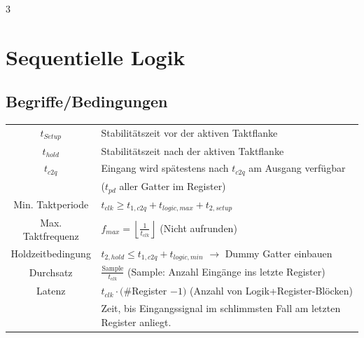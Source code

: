 \documentclass[6pt,a4paper]{scrartcl}
\newcommand{\ra}[0]{\ensuremath{\rightarrow}} 									%
\begin{document}
\begin{multicols*}{3}
	\vspace{-3mm}
	\section{Sequentielle Logik}
	\begin{sectionbox}
		\subsection{Begriffe/Bedingungen}
		\begin{tabular}{c|l}
			$t_{Setup}$       & Stabilitätszeit vor der aktiven Taktflanke                                           \\
			$t_{hold}$        & Stabilitätszeit nach  der aktiven Taktflanke                                         \\
			$t_{c2q}$         & Eingang wird spätestens nach $t_{c2q}$ am Ausgang verfügbar                          \\ & ($t_{pd}$ aller Gatter im Register)                           \\
			Min. Taktperiode  & $t_{clk} \ge t_{1,c2q} + t_{logic,max} + t_{2,setup}$                                \\
			Max. Taktfrequenz & $f_{max} = \left\lfloor \frac{1}{t_{clk}} \right\rfloor$ \qquad (Nicht aufrunden)    \\
			Holdzeitbedingung & $t_{2,hold} \le t_{1,c2q} + t_{logic,min}$  $\ra$ Dummy Gatter einbauen              \\
			Durchsatz         & $\frac{\text{Sample}}{t_{clk}}$ \qquad (Sample: Anzahl Eingänge ins letzte Register) \\
			Latenz            & $t_{clk} \cdot (\#$Register $- 1)$ (Anzahl von Logik+Register-Blöcken)               \\ & Zeit, bis Eingangssignal im schlimmsten Fall am letzten Register anliegt.                  \\
		\end{tabular}
	\end{sectionbox}

	\begin{minipage}{\columnwidth}

\end{minipage}
\end{multicols*}
\end{document}

